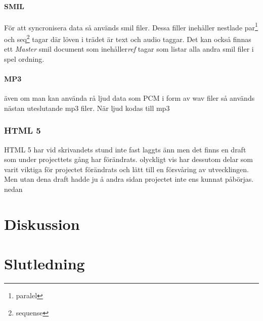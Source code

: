 \documentclass{article}
\begin{document}
\paragraph{SMIL}
För att syncronisera data så används smil filer.
Dessa filler inehåller nestlade par\footnote{paralel} och seq\footnote{sequense} tagar där löven i trädet är text och audio taggar.
Det kan också finnas ett {\em Master} smil document som inehåller{\em ref} tagar som listar alla andra smil filer i spel ordning.

\paragraph{MP3}
även om man kan använda rå ljud data som PCM i form av wav filer så används nästan uteslutande mp3 filer.
När ljud kodas till mp3 

\subsubsection{HTML 5}
HTML 5 har vid skrivandets stund inte fast laggts änn men det finns en draft som under projecttets gång har förändrats.
olyckligt vis har dessutom delar som varit viktiga för projectet förändrats och lätt till en försvåring av utvecklingen.
Men utan dena draft hadde ju å andra sidan projectet inte ens kunnat påbörjas.
nedan 

\section{Diskussion}

\subsection{}

\section{Slutledning}
\end{document}
